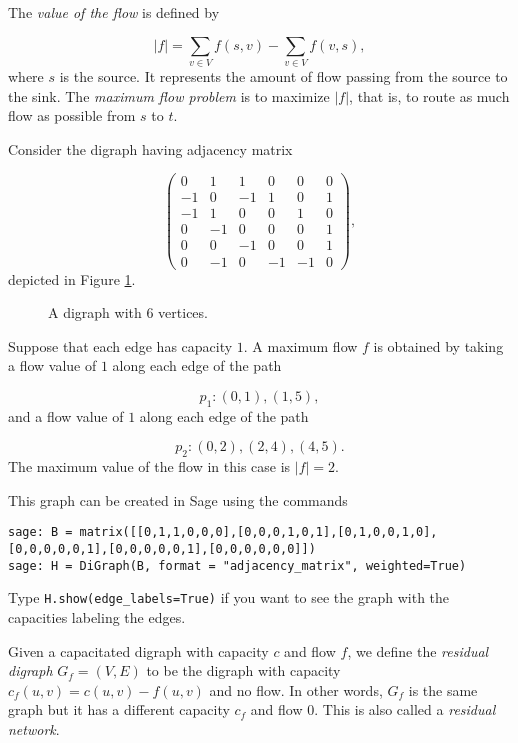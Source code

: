 The {\it value of the flow} is defined by

\[
| f | = \sum_{v\in V}f(s,v)-\sum_{v\in V}f(v,s),
\]
where $s$ is the source.
It represents the amount of flow passing from the source to the sink.
The {\it maximum flow problem} is to maximize $| f |$, that is, to route as
much flow as possible from $s$ to $t$.

\begin{example}
{\rm
Consider the digraph having adjacency matrix

\[
\left(\begin{array}{cccccc}
0 & 1 & 1 & 0 & 0 & 0 \\
-1 & 0 & -1 & 1 & 0 & 1 \\
-1 & 1 & 0 & 0 & 1 & 0 \\
0 & -1 & 0 & 0 & 0 & 1 \\
0 & 0 & -1 & 0 & 0 & 1 \\
0 & -1 & 0 & -1 & -1 & 0
\end{array}\right),
\]
depicted in Figure \ref{fig:digraph-flow1}.

\begin{figure}[!htbp]
\centering

\caption{A digraph with $6$ vertices.}
\label{fig:digraph-flow1}
\end{figure}
Suppose that each edge has capacity $1$.
A maximum flow $f$ is obtained by taking a flow value
of $1$ along each edge of the path

\[
p_1:(0,1),(1,5),
\]
and a flow value
of $1$ along each edge of the path

\[
p_2:(0,2),(2,4),(4,5).
\]
The maximum value of the flow in this case is $|f|=2$.

This graph can be created in Sage using the commands

\begin{lstlisting}
sage: B = matrix([[0,1,1,0,0,0],[0,0,0,1,0,1],[0,1,0,0,1,0],[0,0,0,0,0,1],[0,0,0,0,0,1],[0,0,0,0,0,0]])
sage: H = DiGraph(B, format = "adjacency_matrix", weighted=True)
\end{lstlisting}

\noindent
Type {\tt H.show(edge\_labels=True)} if you want to see the graph with
the capacities labeling the edges.


}
\end{example}


Given a capacitated digraph with capacity $c$ and flow $f$,
we define the {\it residual digraph} $G_f=(V,E)$ to be the
digraph with capacity $c_f(u,v) = c(u,v) - f(u,v)$ and no flow.
In other words, $G_f$ is the same graph but it has a different
capacity $c_f$ and flow $0$.
This is also called a {\it residual network}.

